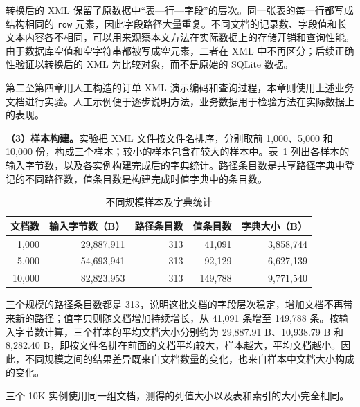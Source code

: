 转换后的 XML 保留了原数据中“表—行—字段”的层次。同一张表的每一行都写成结构相同的 \texttt{row} 元素，因此字段路径大量重复。不同文档的记录数、字段值和长文本内容各不相同，可以用来观察本文方法在实际数据上的存储开销和查询性能。由于数据库空值和空字符串都被写成空元素，二者在 XML 中不再区分；后续正确性验证以转换后的 XML 为比较对象，而不是原始的 SQLite 数据。

第二至第四章用人工构造的订单 XML 演示编码和查询过程，本章则使用上述业务文档进行实验。人工示例便于逐步说明方法，业务数据用于检验方法在实际数据上的表现。

\textbf{（3）样本构建。}实验把 XML 文件按文件名排序，分别取前 1,000、5,000 和 10,000 份，构成三个样本；较小的样本包含在较大的样本中。表~\ref{tab:exp-dataset} 列出各样本的输入字节数，以及各实例构建完成后的字典统计。路径条目数是共享路径字典中登记的不同路径数，值条目数是构建完成时值字典中的条目数。
\begin{table}[htbp]
\centering\small
\caption{不同规模样本及字典统计}
\label{tab:exp-dataset}
\begin{tabular}{rrrrr}
\toprule
文档数 & 输入字节数（B） & 路径条目数 & 值条目数 & 字典大小（B） \\
\midrule
1,000 & 29,887,911 & 313 & 41,091 & 3,858,744 \\
5,000 & 54,693,941 & 313 & 92,129 & 6,627,139 \\
10,000 & 82,823,953 & 313 & 149,788 & 9,771,540 \\
\bottomrule
\end{tabular}
\end{table}

三个规模的路径条目数都是 313，说明这批文档的字段层次稳定，增加文档不再带来新的路径；值字典则随文档增加持续增长，从 41,091 条增至 149,788 条。按输入字节数计算，三个样本的平均文档大小分别约为 29,887.91 B、10,938.79 B 和 8,282.40 B，即按文件名排在前面的文档平均较大，样本越大，平均文档越小。因此，不同规模之间的结果差异既来自文档数量的变化，也来自样本中文档大小构成的变化。

三个 10K 实例使用同一组文档，测得的列值大小以及表和索引的大小完全相同。

